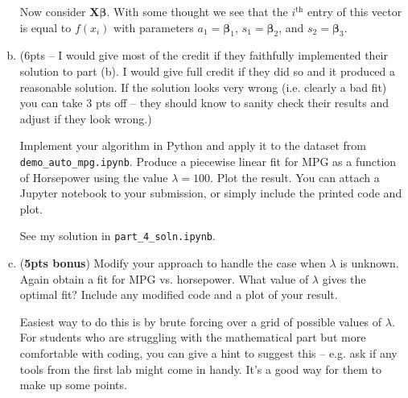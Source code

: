 \documentclass[10pt]{article}
\newcommand{\bs}[1]{\boldsymbol{#1}}
\newcommand{\bv}[1]{\mathbf{#1}}
\begin{document}
\begin{enumerate}[(a)]
	Now consider $\bv{X}\bs{\beta}$. With some thought we see that the $i^\text{th}$ entry of this vector is equal to $f(x_i)$ with parameters $a_1 = \bs{\beta}_1$, $s_1 = \bs{\beta}_2$, and $s_2 = \bs{\beta}_3$.
	\color{black}
	
	\item (6pts -- I would give most of the credit if they faithfully implemented their solution to part (b). I would give full credit if they did so and it produced a reasonable solution. If the solution looks very wrong (i.e. clearly a bad fit) you can take 3 pts off -- they should know to sanity check their results and adjust if they look wrong.)
	
	 Implement your algorithm in Python and apply it to the dataset from \texttt{demo\_auto\_mpg.ipynb}. Produce a piecewise linear fit for MPG as a function of Horsepower using the value $\lambda = 100$. Plot the result. You can attach a Jupyter notebook to your submission, or simply include the printed code and plot. 
	
	\color{blue}
	See my solution in \texttt{part\_4\_soln.ipynb}.
	\color{black}
	
	\item (\textbf{5pts bonus}) Modify your approach to handle the case when $\lambda$ is unknown. Again obtain a fit for MPG vs. horsepower. What value of $\lambda$ gives the optimal fit? Include any modified code and a plot of your result.
	
	\color{blue}
	Easiest way to do this is by brute forcing over a grid of possible values of $\lambda$. For students who are struggling with the mathematical part but more comfortable with coding, you can give a hint to suggest this -- e.g. ask if any tools from the first lab might come in handy. It's a good way for them to make up some points.
	\color{black}
\end{enumerate}
\end{document}
